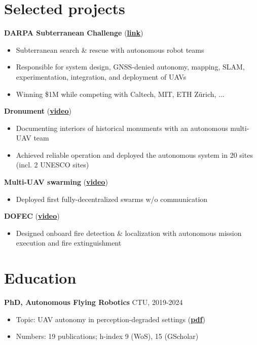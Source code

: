 \documentclass[12pt,a4paper]{article}
\newcommand\Colorhreff[3][reff]{\href{#2}{\color{#1}#3}}
\begin{document}
\begin{paracol}{2}
\section*{Selected projects}

\noindent
\textbf{DARPA Subterranean Challenge} (\Colorhreff{http://mrs.fel.cvut.cz/projects/darpa}{\textbf{link}})
\begin{itemize}
  \item Subterranean search \& rescue with autonomous robot teams
  \item Responsible for system design, GNSS-denied autonomy, mapping, SLAM, experimentation, integration, and deployment of UAVs
  \item Winning \$1M while competing with Caltech, MIT, ETH Zürich, ... 
\end{itemize}

\vspace{0.2cm}
\noindent
\textbf{Dronument} (\Colorhreff{https://www.youtube.com/watch?v=Gx-mBklSbYc}{\textbf{video}})
\begin{itemize}
    \item Documenting interiors of historical monuments with an autonomous multi-UAV team
    \item Achieved reliable operation and deployed the autonomous system in 20 sites (incl. 2 UNESCO sites)
\end{itemize}

\vspace{0.2cm}
\noindent
\textbf{Multi-UAV swarming} (\Colorhreff{https://www.youtube.com/watch?v=Ax3ONfo1hMA}{\textbf{video}})
\begin{itemize}
    \item Deployed first fully-decentralized swarms w/o communication
\end{itemize}

\vspace{0.2cm}
\noindent
\textbf{DOFEC} (\Colorhreff{https://www.youtube.com/watch?v=QHpifXJzH5g}{\textbf{video}})
\begin{itemize}
    \item Designed onboard fire detection \& localization with autonomous mission execution and fire extinguishment
\end{itemize}

\section*{Education}
\textbf{PhD, Autonomous Flying Robotics} \hfill CTU, 2019-2024
\begin{itemize}
  \item Topic: UAV autonomy in perception-degraded settings (\Colorhreff{https://mrs.fel.cvut.cz/data/papers/petracek_phd_thesis.pdf}{\textbf{pdf}})
  \item Numbers: 19 publications; h-index 9 (WoS), 15 (GScholar)
\end{itemize}


\end{paracol}
\end{document}
